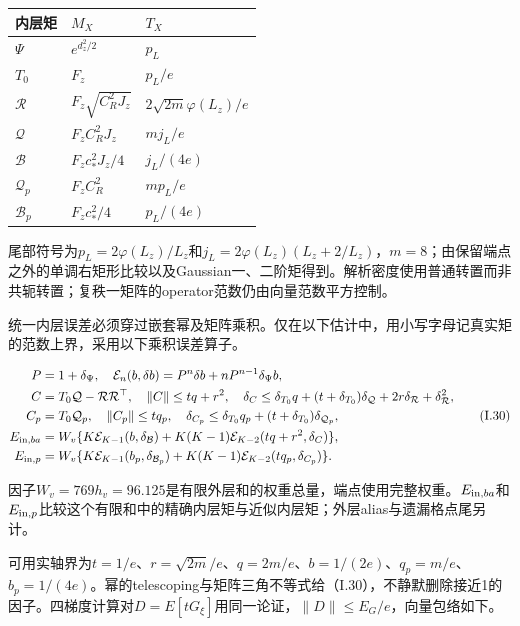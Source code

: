 \documentclass[11pt,a4paper]{article}
\begin{document}
\begin{longtable}[]{@{}lll@{}}
\toprule\noalign{}
内层矩 & \(M_X\) & \(T_X\) \\
\midrule\noalign{}
\endhead
\bottomrule\noalign{}
\endlastfoot
\(\Psi\) & \(e^{d_z^2/2}\) & \(p_L\) \\
\(T_0\) & \(F_z\) & \(p_L/e\) \\
\(\mathcal R\) & \(F_z\sqrt{C_R^2J_z}\) &
\(2\sqrt{2m}\varphi(L_z)/e\) \\
\(\mathcal Q\) & \(F_z C_R^2J_z\) & \(m j_L/e\) \\
\(\mathcal B\) & \(F_z c_*^2J_z/4\) & \(j_L/(4e)\) \\
\(\mathcal Q_p\) & \(F_z C_R^2\) & \(m p_L/e\) \\
\(\mathcal B_p\) & \(F_z c_*^2/4\) & \(p_L/(4e)\) \\
\end{longtable}

尾部符号为\(p_L=2\varphi(L_z)/L_z\)和\(j_L=2\varphi(L_z)(L_z+2/L_z)\)，\(m=8\)；由保留端点之外的单调右矩形比较以及Gaussian一、二阶矩得到。解析密度使用普通转置而非共轭转置；复秩一矩阵的operator范数仍由向量范数平方控制。

统一内层误差必须穿过嵌套幂及矩阵乘积。仅在以下估计中，用小写字母记真实矩的范数上界，采用以下乘积误差算子。

\[
\begin{aligned}
P&=1+\delta_\Psi,\quad
\mathcal E_n(b,\delta b)=P^n\delta b+nP^{n-1}\delta_\Psi b,\\
C&=T_0\mathcal Q-\mathcal R\mathcal R^\top,\quad
\|C\|\le tq+r^2,\quad
\delta_C\le\delta_{T_0}q+(t+\delta_{T_0})\delta_{\mathcal Q}+2r\delta_{\mathcal R}+\delta_{\mathcal R}^2,\\
C_p&=T_0\mathcal Q_p,\quad\|C_p\|\le tq_p,\quad
\delta_{C_p}\le\delta_{T_0}q_p+(t+\delta_{T_0})\delta_{\mathcal Q_p},\\
E_{{\rm in},ba}&=W_v\{K\mathcal E_{K-1}(b,\delta_{\mathcal B})
+K(K-1)\mathcal E_{K-2}(tq+r^2,\delta_C)\},\\
E_{{\rm in},p}&=W_v\{K\mathcal E_{K-1}(b_p,\delta_{\mathcal B_p})
+K(K-1)\mathcal E_{K-2}(tq_p,\delta_{C_p})\}.
\end{aligned}
\tag{I.30}
\]

因子\(W_v=769h_v=96.125\)是有限外层和的权重总量，端点使用完整权重。\(E_{{\rm in},ba}\)和\(E_{{\rm in},p}\)比较这个有限和中的精确内层矩与近似内层矩；外层alias与遗漏格点尾另计。

可用实轴界为\(t=1/e\)、\(r=\sqrt{2m}/e\)、\(q=2m/e\)、\(b=1/(2e)\)、\(q_p=m/e\)、\(b_p=1/(4e)\)。幂的telescoping与矩阵三角不等式给（I.30），不静默删除接近1的因子。四梯度计算对\(D=E[tG_\xi]\)用同一论证，\(\|D\|\le E_G/e\)，向量包络如下。
\end{document}
